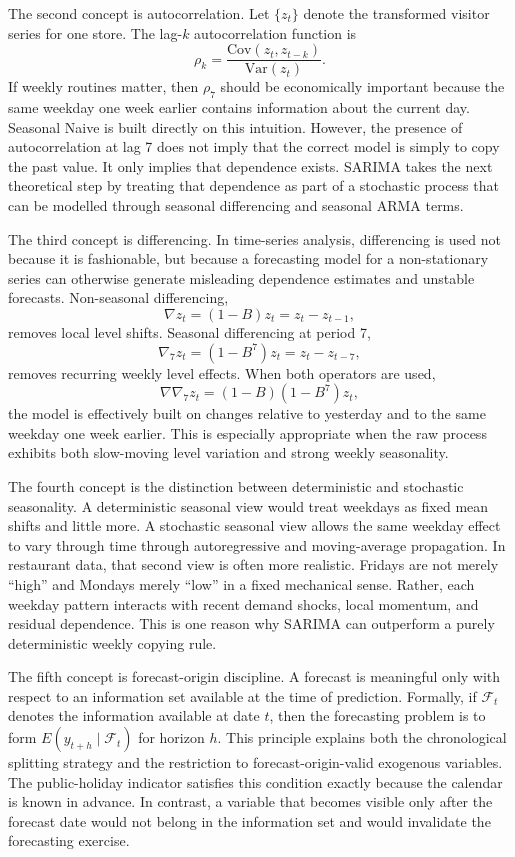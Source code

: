 \documentclass[11pt,oneside]{scrartcl}
\begin{document}
The second concept is autocorrelation. Let $\{z_t\}$ denote the transformed visitor series for one store. The lag-$k$ autocorrelation function is
\[
\rho_k = \frac{\mathrm{Cov}(z_t,z_{t-k})}{\mathrm{Var}(z_t)}.
\]
If weekly routines matter, then $\rho_7$ should be economically important because the same weekday one week earlier contains information about the current day. Seasonal Naive is built directly on this intuition. However, the presence of autocorrelation at lag 7 does not imply that the correct model is simply to copy the past value. It only implies that dependence exists. SARIMA takes the next theoretical step by treating that dependence as part of a stochastic process that can be modelled through seasonal differencing and seasonal ARMA terms.

The third concept is differencing. In time-series analysis, differencing is used not because it is fashionable, but because a forecasting model for a non-stationary series can otherwise generate misleading dependence estimates and unstable forecasts. Non-seasonal differencing,
\[
\nabla z_t = (1-B)z_t = z_t-z_{t-1},
\]
removes local level shifts. Seasonal differencing at period 7,
\[
\nabla_7 z_t = (1-B^7)z_t = z_t-z_{t-7},
\]
removes recurring weekly level effects. When both operators are used,
\[
\nabla \nabla_7 z_t = (1-B)(1-B^7)z_t,
\]
the model is effectively built on changes relative to yesterday and to the same weekday one week earlier. This is especially appropriate when the raw process exhibits both slow-moving level variation and strong weekly seasonality.

The fourth concept is the distinction between deterministic and stochastic seasonality. A deterministic seasonal view would treat weekdays as fixed mean shifts and little more. A stochastic seasonal view allows the same weekday effect to vary through time through autoregressive and moving-average propagation. In restaurant data, that second view is often more realistic. Fridays are not merely ``high'' and Mondays merely ``low'' in a fixed mechanical sense. Rather, each weekday pattern interacts with recent demand shocks, local momentum, and residual dependence. This is one reason why SARIMA can outperform a purely deterministic weekly copying rule.

The fifth concept is forecast-origin discipline. A forecast is meaningful only with respect to an information set available at the time of prediction. Formally, if $\mathcal{F}_t$ denotes the information available at date $t$, then the forecasting problem is to form $E(y_{t+h}\mid \mathcal{F}_t)$ for horizon $h$. This principle explains both the chronological splitting strategy and the restriction to forecast-origin-valid exogenous variables. The public-holiday indicator satisfies this condition exactly because the calendar is known in advance. In contrast, a variable that becomes visible only after the forecast date would not belong in the information set and would invalidate the forecasting exercise.
\end{document}
